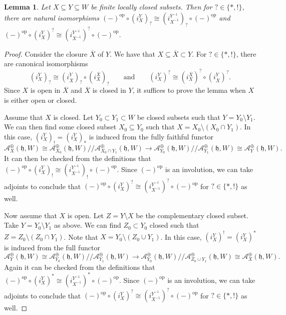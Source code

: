 \documentclass{amsart}
\newcommand{\scrA}{\mathcal{A}}
\newcommand{\fr}[1]{\mathfrak{#1}}
\DeclareMathOperator{\op}{op}
\newtheorem{lemma}{Lemma}[section]
\theoremstyle{definition}
\begin{document}
        \begin{lemma}\label{lem:refl_commutes_with_sheaf_functors}
                Let $X \subseteq Y \subseteq W$ be finite locally closed subsets. 
                Then for $? \in \{*,!\}$, there are natural isomorphisms $(-)^{\op} \circ (i_X^Y)_? \cong (i_{X^{-1}}^{Y^{-1}})_? \circ (-)^{\op}$ and $(-)^{\op} \circ (i_X^Y)^? \cong (i_{X^{-1}}^{Y^{-1}})^? \circ (-)^{\op}$. 
        \end{lemma}
        \begin{proof}
                Consider the closure $\overline{X}$ of $Y$. We have that $X \subseteq \overline{X} \subset Y$. For $? \in \{*,!\}$, there are canonical isomorphisms
                \[(i_X^Y)_? \cong (i_{\overline{X}}^Y)_? \circ (i_X^{\overline{X}})_? \qquad\text{and}\qquad (i_X^Y)^? \cong  (i_X^{\overline{X}})^? \circ (i_{\overline{X}}^Y)^?.\]
                Since $X$ is open in $\overline{X}$ and $\overline{X}$ is closed in $Y$, it suffices to prove the lemma when $X$ is either open or closed.

                Assume that $X$ is closed. Let $Y_0 \subset Y_1 \subset W$ be closed subsets such that $Y = Y_0 \setminus Y_1$.
                We can then find some closed subset $X_0 \subseteq Y_0$ such that $X = X_0 \setminus (X_0 \cap Y_1)$. 
                In this case, $(i_X^Y)_! =(i_X^Y)_*$ is induced from the fully faithful functor
                \[ \scrA^{\oplus}_{X} (\fr{h}, W) \cong \scrA^{\oplus}_{X_0} (\fr{h}, W) /\!\!/ \scrA^{\oplus}_{ X_0 \cap Y_1} (\fr{h}, W) \to \scrA^{\oplus}_{ Y_0} (\fr{h}, W) /\!\!/ \scrA^{\oplus}_{ Y_1} (\fr{h}, W) \cong \scrA^{\oplus}_{ Y} (\fr{h}, W).\]
                It can then be checked from the definitions that $(-)^{\op} \circ (i_X^Y)_! \cong (i_{X^{-1}}^{Y^{-1}})_! \circ (-)^{\op}$. Since $(-)^{\op}$ is an involution, we can take adjoints to conclude that $(-)^{\op} \circ (i_X^Y)^? \cong (i_{X^{-1}}^{Y^{-1}})^? \circ (-)^{\op}$ for $? \in \{*,!\}$ as well.
        
                Now assume that $X$ is open. Let $Z = Y \setminus X$ be the complementary closed subset. 
                Take $Y = Y_0 \setminus Y_1$ as above.  
                We can find $Z_0 \subset Y_0$ closed such that $Z = Z_0 \setminus (Z_0 \cap Y_1)$. Note that $X = Y_0 \setminus (Z_0 \cup Y_1)$. 
                In this case, $(i_X^Y)^! =(i_X^Y)^*$ is induced from the full functor
                \[ \scrA^{\oplus}_{Y} (\fr{h}, W) \cong \scrA^{\oplus}_{Y_0} (\fr{h}, W) /\!\!/ \scrA^{\oplus}_{ Y_1} (\fr{h}, W) \to \scrA^{\oplus}_{ Y_0} (\fr{h}, W) /\!\!/ \scrA^{\oplus}_{ Z_0 \cup Y_1} (\fr{h}, W) \cong \scrA^{\oplus}_{ X} (\fr{h}, W).\]
                Again it can be checked from the definitions that  $(-)^{\op} \circ (i_X^Y)^* \cong (i_{X^{-1}}^{Y^{-1}})^* \circ (-)^{\op}$. Since $(-)^{\op}$ is an involution, we can take adjoints to conclude that $(-)^{\op} \circ (i_X^Y)^? \cong (i_{X^{-1}}^{Y^{-1}})^? \circ (-)^{\op}$ for $? \in \{*,!\}$ as well.
        \end{proof}
\end{document}
